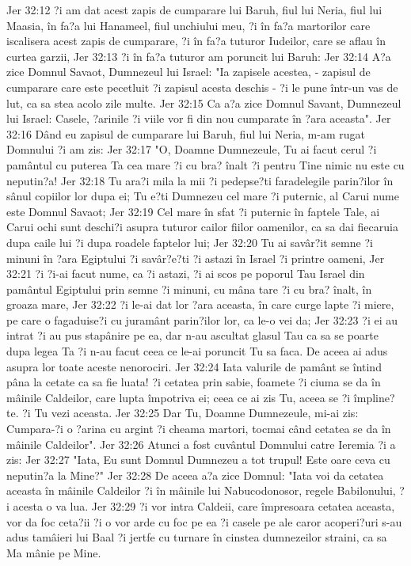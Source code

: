 Jer 32:12  ?i am dat acest zapis de cumparare lui Baruh, fiul lui Neria, fiul lui Maasia, în fa?a lui Hanameel, fiul unchiului meu, ?i în fa?a martorilor care iscalisera acest zapis de cumparare, ?i în fa?a tuturor Iudeilor, care se aflau în curtea garzii,
Jer 32:13  ?i în fa?a tuturor am poruncit lui Baruh:
Jer 32:14  A?a zice Domnul Savaot, Dumnezeul lui Israel: "Ia zapisele acestea, - zapisul de cumparare care este pecetluit ?i zapisul acesta deschis - ?i le pune într-un vas de lut, ca sa stea acolo zile multe.
Jer 32:15  Ca a?a zice Domnul Savant, Dumnezeul lui Israel: Casele, ?arinile ?i viile vor fi din nou cumparate în ?ara aceasta".
Jer 32:16  Dând eu zapisul de cumparare lui Baruh, fiul lui Neria, m-am rugat Domnului ?i am zis:
Jer 32:17  "O, Doamne Dumnezeule, Tu ai facut cerul ?i pamântul cu puterea Ta cea mare ?i cu bra? înalt ?i pentru Tine nimic nu este cu neputin?a!
Jer 32:18  Tu ara?i mila la mii ?i pedepse?ti faradelegile parin?ilor în sânul copiilor lor dupa ei; Tu e?ti Dumnezeu cel mare ?i puternic, al Carui nume este Domnul Savaot;
Jer 32:19  Cel mare în sfat ?i puternic în faptele Tale, ai Carui ochi sunt deschi?i asupra tuturor cailor fiilor oamenilor, ca sa dai fiecaruia dupa caile lui ?i dupa roadele faptelor lui;
Jer 32:20  Tu ai savâr?it semne ?i minuni în ?ara Egiptului ?i savâr?e?ti ?i astazi în Israel ?i printre oameni,
Jer 32:21  ?i ?i-ai facut nume, ca ?i astazi, ?i ai scos pe poporul Tau Israel din pamântul Egiptului prin semne ?i minuni, cu mâna tare ?i cu bra? înalt, în groaza mare,
Jer 32:22  ?i le-ai dat lor ?ara aceasta, în care curge lapte ?i miere, pe care o fagaduise?i cu juramânt parin?ilor lor, ca le-o vei da;
Jer 32:23  ?i ei au intrat ?i au pus stapânire pe ea, dar n-au ascultat glasul Tau ca sa se poarte dupa legea Ta ?i n-au facut ceea ce le-ai poruncit Tu sa faca. De aceea ai adus asupra lor toate aceste nenorociri.
Jer 32:24  Iata valurile de pamânt se întind pâna la cetate ca sa fie luata! ?i cetatea prin sabie, foamete ?i ciuma se da în mâinile Caldeilor, care lupta împotriva ei; ceea ce ai zis Tu, aceea se ?i împline?te. ?i Tu vezi aceasta.
Jer 32:25  Dar Tu, Doamne Dumnezeule, mi-ai zis: Cumpara-?i o ?arina cu argint ?i cheama martori, tocmai când cetatea se da în mâinile Caldeilor".
Jer 32:26  Atunci a fost cuvântul Domnului catre Ieremia ?i a zis:
Jer 32:27  "Iata, Eu sunt Domnul Dumnezeu a tot trupul! Este oare ceva cu neputin?a la Mine?"
Jer 32:28  De aceea a?a zice Domnul: "Iata voi da cetatea aceasta în mâinile Caldeilor ?i în mâinile lui Nabucodonosor, regele Babilonului, ?i acesta o va lua.
Jer 32:29  ?i vor intra Caldeii, care împresoara cetatea aceasta, vor da foc ceta?ii ?i o vor arde cu foc pe ea ?i casele pe ale caror acoperi?uri s-au adus tamâieri lui Baal ?i jertfe cu turnare în cinstea dumnezeilor straini, ca sa Ma mânie pe Mine.
